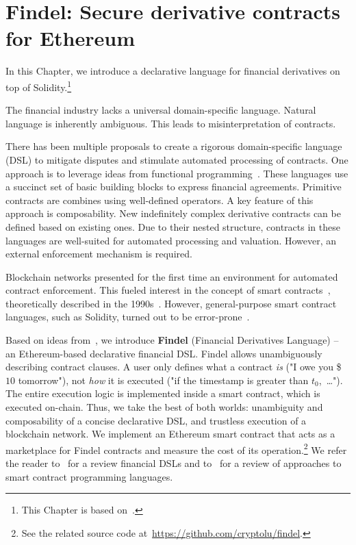 \chapter{Findel: Secure derivative contracts for Ethereum}

\label{Chapter10Findel}

In this Chapter, we introduce a declarative language for financial derivatives on top of Solidity.\footnote{This Chapter is based on~\cite{Biryukov2017}.}

The financial industry lacks a universal domain-specific language.
Natural language is inherently ambiguous.
This leads to misinterpretation of contracts.

There has been multiple proposals to create a rigorous domain-specific language (DSL) to mitigate disputes and stimulate automated processing of contracts.
One approach is to leverage ideas from functional programming~\cite{PeytonJones2000, Szabo2002, Frankau2009, Gaillourdet2011, Schuldenzucker2014, Schuldenzucker2016}.
These languages use a succinct set of basic building blocks to express financial agreements.
Primitive contracts are combines using well-defined operators.
A key feature of this approach is composability.
New indefinitely complex derivative contracts can be defined based on existing ones.
Due to their nested structure, contracts in these languages are well-suited for automated processing and valuation.
However, an external enforcement mechanism is required.

Blockchain networks presented for the first time an environment for automated contract enforcement.
This fueled interest in the concept of smart contracts~\cite{Castillo2016}, theoretically described in the 1990s~\cite{Szabo1997}.
However, general-purpose smart contract languages, such as Solidity, turned out to be error-prone~\cite{Sirer2016, Atzei2017}.

Based on ideas from~\cite{PeytonJones2000}, we introduce \textbf{Findel} (Financial Derivatives Language) -- an Ethereum-based declarative financial DSL\@.
Findel allows unambiguously describing contract clauses.
A user only defines what a contract \textit{is} ("I owe you \$$10$ tomorrow"), not \textit{how} it is executed ("if the timestamp is greater than $t_0$,~\dots").
The entire execution logic is implemented inside a smart contract, which is executed on-chain.
Thus, we take the best of both worlds: unambiguity and composability of a concise declarative DSL, and trustless execution of a blockchain network.
We implement an Ethereum smart contract that acts as a marketplace for Findel contracts and measure the cost of its operation.\footnote{See the related source code at~\url{https://github.com/cryptolu/findel}.}
We refer the reader to~\cite{Hvitved2010, Schiller2013} for a review financial DSLs and to~\cite{Seijas2016, Clack2016} for a review of approaches to smart contract programming languages.


